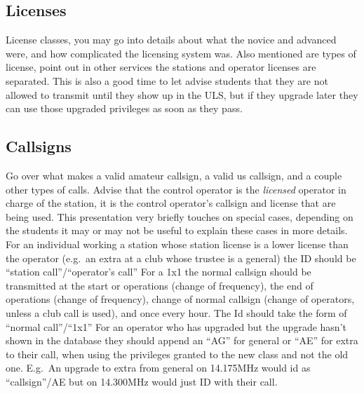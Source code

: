 \documentclass[12pt,letterpaper]{report}
\begin{document}
\subsection*{Licenses}
License classes, you may go into details about what the novice and advanced were, and how complicated the licensing system was. Also mentioned are types of license, point out in other services the stations and operator licenses are separated. This is also a good time to let advise students that they are not allowed to transmit until they show up in the ULS, but if they upgrade later they can use those upgraded privileges as soon as they pass.

\subsection*{Callsigns}
Go over what makes a valid amateur callsign, a valid us callsign, and a couple other types of calls. Advise that the control operator is the \textit{licensed} operator in charge of the station, it is the control operator's callsign and license that are being used. This presentation very briefly touches on special cases, depending on the students it may or may not be useful to explain these cases in more details.
For an individual working a station whose station license is a lower license than the operator (e.g.\ an extra at a club whose trustee is a general) the ID should be ``station call''/``operator's call''
For a 1x1 the normal callsign should be transmitted at the start or operations (change of frequency), the end of operations (change of frequency), change of normal callsign (change of operators, unless a club call is used), and once every hour. The Id should take the form of ``normal call''/``1x1''
For an operator who has upgraded but the upgrade hasn't shown in the database they should append an ``AG'' for general or ``AE'' for extra to their call, when using the privileges granted to the new class and not the old one. E.g.\ An upgrade to extra from general on 14.175MHz would id as ``callsign''/AE but on 14.300MHz would just ID with their call.
\end{document}
